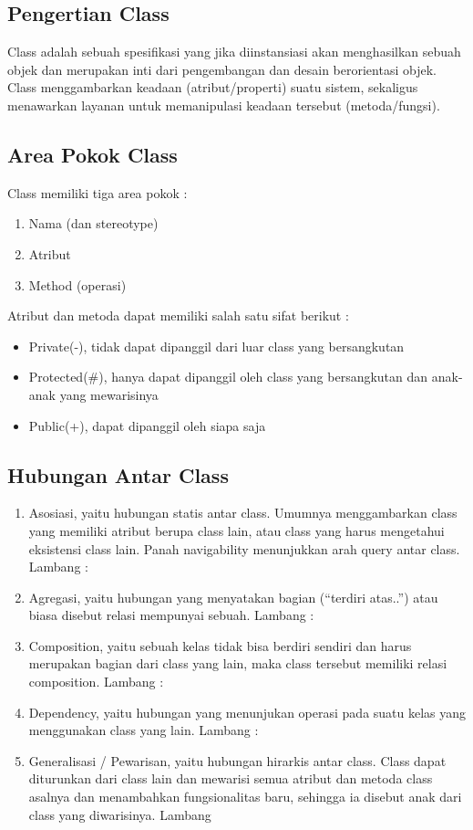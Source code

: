 \subsection{Pengertian Class}
Class adalah sebuah spesifikasi yang jika diinstansiasi akan menghasilkan sebuah
objek dan merupakan inti dari pengembangan dan desain berorientasi objek. Class
menggambarkan keadaan (atribut/properti) suatu sistem, sekaligus menawarkan layanan
untuk memanipulasi keadaan tersebut (metoda/fungsi).

\subsection{Area Pokok Class}
Class memiliki tiga area pokok :
\begin{enumerate}
\item
Nama (dan stereotype)
\item
Atribut
\item
Method (operasi)
\end{enumerate}
Atribut dan metoda dapat memiliki salah satu sifat berikut :
\begin{itemize}
\item
Private(-), tidak dapat dipanggil dari luar class yang bersangkutan
\item
Protected(\#), hanya dapat dipanggil oleh class yang bersangkutan dan anak-anak yang
mewarisinya
\item
Public(+), dapat dipanggil oleh siapa saja
\end{itemize}

\subsection{Hubungan Antar Class}
\begin{enumerate}
\item
Asosiasi, yaitu hubungan statis antar class. Umumnya menggambarkan class yang
memiliki atribut berupa class lain, atau class yang harus mengetahui eksistensi
class lain. Panah navigability menunjukkan arah query antar class.
Lambang :
\item
Agregasi, yaitu hubungan yang menyatakan bagian (“terdiri atas..”) atau biasa
disebut relasi mempunyai sebuah.
Lambang :
\item
Composition, yaitu sebuah kelas tidak bisa berdiri sendiri dan harus merupakan
bagian dari class yang lain, maka class tersebut memiliki relasi composition.
Lambang :
\item
Dependency, yaitu hubungan yang menunjukan operasi pada suatu kelas yang
menggunakan class yang lain.
Lambang :
\item
Generalisasi / Pewarisan, yaitu hubungan hirarkis antar class. Class dapat
diturunkan dari class lain dan mewarisi semua atribut dan metoda class asalnya
dan menambahkan fungsionalitas baru, sehingga ia disebut anak dari class yang
diwarisinya.
Lambang
\end{enumerate}




